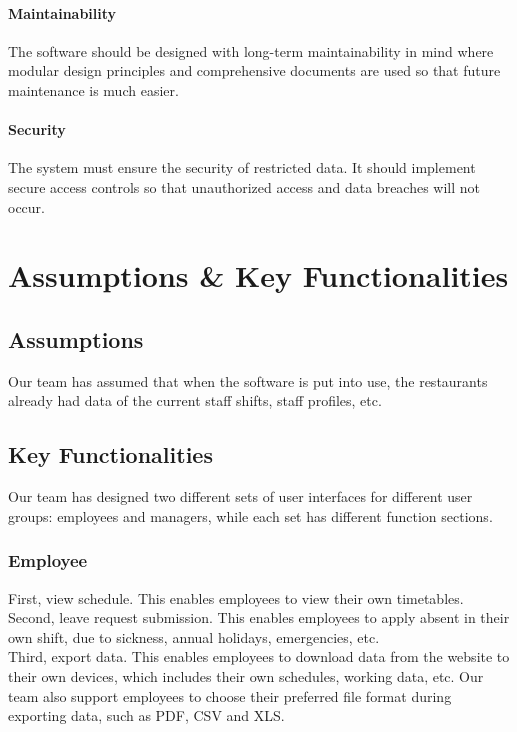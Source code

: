 \documentclass[a4paper,12pt, oneside]{report}
\begin{document}
\subsubsection{Maintainability}
The software should be designed with long-term maintainability in mind where modular design principles and comprehensive documents are used so that future maintenance is much easier.\\

\subsubsection{Security}
The system must ensure the security of restricted data. It should implement secure access controls so that unauthorized access and data breaches will not occur.\\


\chapter{Assumptions \& Key Functionalities}
\section{Assumptions}
Our team has assumed that when the software is put into use, the restaurants already had data of the current staff shifts, staff profiles, etc.\\
\section{Key Functionalities}
Our team has designed two different sets of user interfaces for different user groups: employees and managers, while each set has different function sections.\\
\subsection{Employee}
First, view schedule. This enables employees to view their own timetables.\\

Second, leave request submission. This enables employees to apply absent in their own shift, due to sickness, annual holidays, emergencies, etc.\\

Third, export data. This enables employees to download data from the website to their own devices, which includes their own schedules, working data, etc. Our team also support employees to choose their preferred file format during exporting data, such as PDF, CSV and XLS.\\
\end{document}
